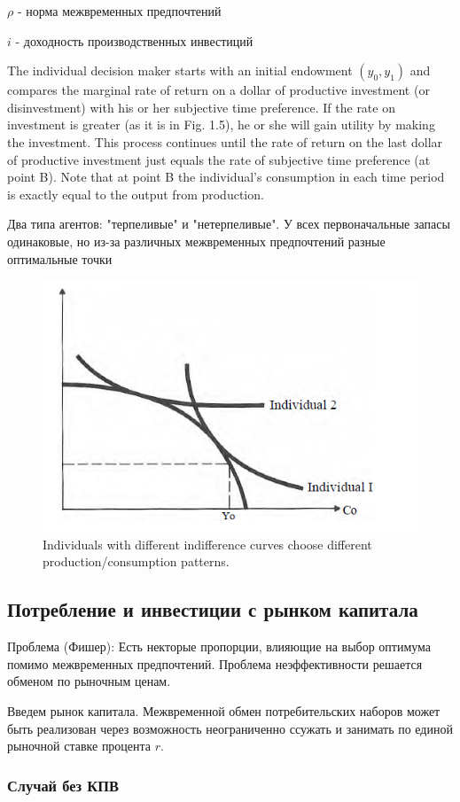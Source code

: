 \documentclass[a4paper,12pt]{article} %
\begin{document}
$ \rho $ - норма межвременных предпочтений

$ i $
- доходность производственных инвестиций

The individual decision maker starts with an
initial endowment $ (y_0, y_1) $ and compares the marginal rate of return on a dollar of
productive investment (or disinvestment) with his or her subjective time preference.
If the rate on investment is greater (as it is in Fig. 1.5), he or she will gain utility by
making the investment. This process continues until the rate of return on the last
dollar of productive investment just equals the rate of subjective time preference (at
point B). Note that at point B the individual's consumption in each time period is
exactly equal to the output from production.

Два типа агентов: "терпеливые" и "нетерпеливые". У всех первоначальные запасы одинаковые, но из-за различных межвременных предпочтений разные оптимальные точки

 \begin{figure}[h!]
 	\centering
 	\includegraphics[width=0.5\linewidth]{screenshot002}
 	\caption{Individuals with different indifference curves choose  		different production/consumption patterns.}
 	\label{fig:screenshot002}
 \end{figure}
 
\subsection{Потребление и инвестиции с рынком капитала} 

Проблема (Фишер): 
Есть некторые пропорции, влияющие на выбор оптимума помимо межвременных предпочтений. Проблема неэффективности решается обменом по рыночным ценам. 

Введем рынок капитала. Межвременной обмен потребительских наборов может быть реализован через возможность неограниченно ссужать и занимать по единой рыночной ставке процента $ r $.

\subsubsection{Случай без КПВ}
\end{document}
